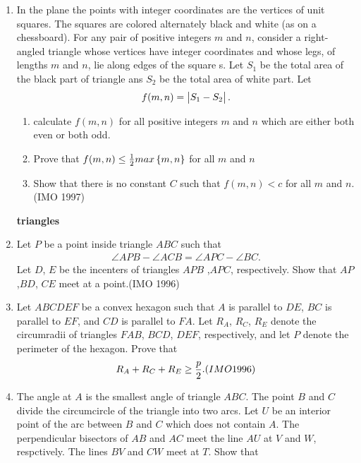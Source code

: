 \begin{enumerate}
 \item In the plane the points with integer coordinates are the vertices of unit squares. The squares are colored alternately black and white (as on a chessboard).
For any pair of positive integers $m$ and $n$, consider a right-angled triangle whose vertices have integer coordinates and whose legs, of lengths $m$ and $n$, lie along edges of the square s.
Let $S_1$ be the total area of the black part of triangle ans $S_2$ be the total area of white part. Let
  \begin{align}
          f(m,n)=\begin{vmatrix}S_1-S_2\end{vmatrix}.
  \end{align}
  \begin{enumerate}
\item calculate $f(m,n)$ for all positive integers $m$ and $n$ which are either both even or both odd.
 \item Prove that $f(m,n) \leq \frac{1}{2}max\left\{m,n\right\}$ for all $m$ and $n$
  \item Show that there is no constant $C$ such that $f(m,n)<c$ for all $m$ and $n$.\hfill(IMO 1997)
  \end{enumerate}	
\textbf{triangles}
\item Let $P$ be a point inside triangle $ABC$ such     that                                         
\begin{align}                                      
	\angle{APB}-\angle{ACB}=\angle{APC}-\angle{ BC}.
 \end{align}                                       
Let $D$, $E$ be the incenters of triangles $APB$ ,$APC$, respectively. Show that $AP$ ,$BD$, $CE$ meet at a point.\hfill(IMO 1996)
\item Let $ABCDEF$ be a convex hexagon such that $A$ is parallel to $DE$, $BC$ is parallel to $EF$, and $CD$ is parallel to $FA$. Let $R_A$, $R_C$, $R_E$ denote the circumradii of triangles $FAB$, $BCD$, $DEF$, respectively, and let $P$ denote the perimeter of the hexagon. Prove that            
\begin{align}                                            R_A+R_C+R_E\geq\frac{p}{2}.\hfill(IMO 1996)  
\end{align}
\item The angle at $A$ is the smallest angle of triangle $ABC$. The point $B$ and $C$ divide the circumcircle of the triangle into two arcs. Let $U$ be an interior point of the arc between $B$ and $C$ which does not contain $A$. The perpendicular bisectors of  $AB$ and $AC$ meet the line $AU$ at $V$ and $W$, respctively. The lines $BV$ and $CW$ meet at $T$. Show that

\end{enumerate}
